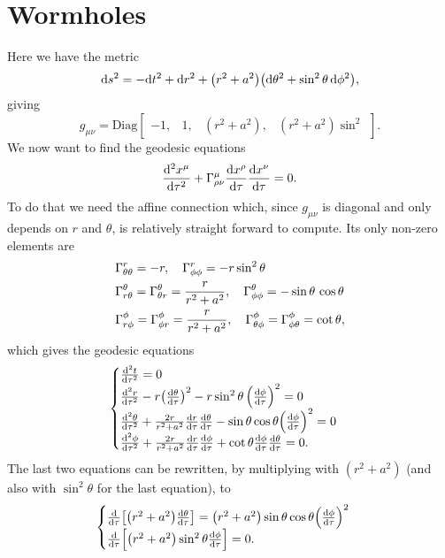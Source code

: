 \documentclass[11pt,a4paper, 
swedish, english %
]{article}
\begin{document}
\section{Wormholes}
Here we have the metric
\begin{equation}\label{eq12:ds}
\mathrm{d}{s}^2=-\mathrm{d}{t}^2+\mathrm{d}{r}^2
+\qty(r^2+a^2)\qty(\mathrm{d}\theta^2+\sin^2\theta\,\mathrm{d}\phi^2),
\end{equation}
giving 
\begin{equation}
g_{\mu\nu}=\text{Diag}
\begin{bmatrix}
-1,& 1,& (r^2+a^2),& (r^2+a^2)\sin^2
\end{bmatrix}.
\end{equation}
We now want to find the geodesic equations
\begin{equation}
\dv[2]{x^\mu}{\tau}+\Gamma^\mu_{\rho\nu}\dv{x^\rho}{\tau}\dv{x^\nu}{\tau}=0. 
\end{equation}
To do that we need the affine connection which, since $g_{\mu\nu}$ is
diagonal and only depends on $r$ and $\theta$, is relatively straight
forward to compute. Its only non-zero elements are
\begin{equation}\label{eq12:Gamma}
\begin{aligned}
&\Gamma^r_{\theta\theta}=-r\qc
\Gamma^r_{\phi\phi}=-r\sin^2\theta\\
&\Gamma^{\theta}_{r\theta}=\Gamma^{\theta}_{\theta r}
=\frac{r}{r^2+a^2}\qc
\Gamma^{\theta}_{\phi\phi}=-\sin\theta\,\cos\theta\\
&\Gamma^{\phi}_{r\phi}=\Gamma^{\phi}_{\phi r}=\frac{r}{r^2+a^2}\qc
\Gamma^\phi_{\theta\phi}=\Gamma^\phi_{\phi\theta}=\cot\theta,
\end{aligned}
\end{equation}
which gives the geodesic equations
\begin{equation}
\begin{cases}
\dv[2]{t}{\tau}=0\\
\dv[2]{r}{\tau}-r\qty(\dv{\theta}{\tau})^2
-r\sin^2\theta\,\qty(\dv{\phi}{\tau})^2=0\\
\dv[2]{\theta}{\tau}+\frac{2r}{r^2+a^2}\dv{r}{\tau}\dv{\theta}{\tau}
-\sin\theta\cos\theta\qty(\dv{\phi}{\tau})^2=0\\
\dv[2]{\phi}{\tau}+\frac{2r}{r^2+a^2}\dv{r}{\tau}\dv{\phi}{\tau}
+\cot\theta\dv{\phi}{\tau}\dv{\theta}{\tau}=0.
\end{cases}
\end{equation}
The last two equations can be rewritten, by multiplying with
$(r^2+a^2)$ (and also with $\sin^2\theta$ for the last equation), to
\begin{equation}
\begin{cases}
\dv{\tau}\qty[\qty(r^2+a^2)\dv{\theta}{\tau}]
=\qty(r^2+a^2)\sin\theta\cos\theta\qty(\dv{\phi}{\tau})^2\\[0.5ex]
\dv{\tau}\qty[\qty(r^2+a^2)\sin^2\theta\dv{\phi}{\tau}]=0.
\end{cases}
\end{equation}
\end{document}
